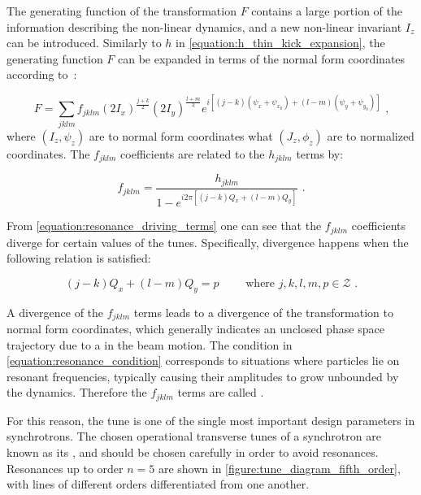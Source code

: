 The generating function of the transformation \(F\) contains a large portion of the information describing the non-linear dynamics, and a new non-linear invariant \(I_z\) can be introduced. 
Similarly to \(h\) in \cref{equation:h_thin_kick_expansion}, the generating function \(F\) can be expanded in terms of the normal form coordinates according to~\cite{PHD:Franchi}:

\begin{equation}
    F = \sum_{jklm} f_{jklm} \left( 2 I_x \right)^{\frac{j+k}{2}} \left(2 I_y \right)^{\frac{l+m}{2}} e^{i \left[ (j-k) \left( \psi_x + \psi_{x_0} \right) + (l-m) \left( \psi_y + \psi_{y_0} \right) \right]} \text{ ,}
    \label{equation:generating_function_expansion}
\end{equation}
where \((I_z, \psi_z)\) are to normal form coordinates what \((J_z, \phi_z)\) are to normalized coordinates.
The \(f_{jklm}\) coefficients are related to the \(h_{jklm}\) terms by:

\begin{equation}
    f_{jklm} = \frac{h_{jklm}}{1 - e^{i 2 \pi \left[ \left(j-k\right) Q_x + \left(l-m\right) Q_y \right]}} \text{ .}
    \label{equation:resonance_driving_terms}
\end{equation}

From \cref{equation:resonance_driving_terms} one can see that the \(f_{jklm}\) coefficients diverge for certain values of the tunes.
Specifically, divergence happens when the following relation is satisfied:

\begin{equation}
    \left(j-k\right) Q_x + \left(l-m\right) Q_y = p \quad \quad \text { where } j, k, l, m, p \in \mathcal{Z} \text{ .}
    \label{equation:resonance_condition}
\end{equation}

A divergence of the \(f_{jklm}\) terms leads to a divergence of the transformation to normal form coordinates, which generally indicates an unclosed phase space trajectory due to a  in the beam motion.
The condition in \cref{equation:resonance_condition} corresponds to situations where particles lie on resonant frequencies, typically causing their amplitudes to grow unbounded by the dynamics.
Therefore the \(f_{jklm}\) terms are called .%

For this reason, the tune is one of the single most important design parameters in synchrotrons.
The chosen operational transverse tunes of a synchrotron are known as its , and should be chosen carefully in order to avoid resonances.
Resonances up to order \(n = 5\) are shown in \cref{figure:tune_diagram_fifth_order}, with lines of different orders differentiated from one another.

